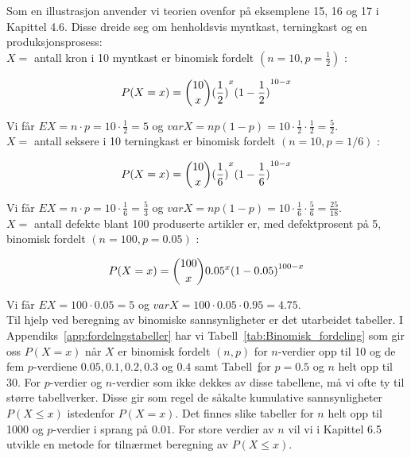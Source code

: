 \noindent Som en illustrasjon anvender vi teorien ovenfor på
 eksemplene 15, 16 og 17 i Kapittel 4.6. Disse dreide seg om henholdsvis
 myntkast, terningkast og en produksjonsprosess: \\

\noindent $X=$ antall kron i 10 myntkast er binomisk fordelt
 $(n=10,p=\frac{1}{2})$ :

\[ P(X=x)={{10}\choose{x}}{(\frac{1}{2})}^x{(1-\frac{1}{2})}^{10-x} \]

\noindent Vi får $EX=n\cdot p=10 \cdot \frac{1}{2}=5$ og
 $varX=np(1-p)=10 \cdot \frac{1}{2} \cdot \frac{1}{2} = \frac{5}{2}$.\\ 

\noindent  $X=$ antall seksere i 10 terningkast er binomisk fordelt
$(n=10, p=1/6)$ :

\[ P(X=x)={{10}\choose{x}}{(\frac{1}{6})}^x{(1-\frac{1}{6})}^{10-x} \]

\noindent Vi får $EX=n\cdot p=10 \cdot \frac{1}{6}=\frac{5}{3}$ og
 $varX=np(1-p)=10 \cdot \frac{1}{6} \cdot \frac{5}{6} = \frac{25}{18}$.\\ 

\noindent $X=$ antall defekte blant 100 produserte artikler er, med
defektprosent på 5, binomisk fordelt $(n=100, p=0.05)$ :

\[ P(X=x)={{100}\choose{x}}{0.05}^x{(1-0.05)}^{100-x} \]

\noindent Vi får $EX=100\cdot 0.05=5$ og $var X=100\cdot 0.05\cdot
0.95=4.75$. \\

Til hjelp ved beregning av binomiske sannsynligheter er det
utarbeidet tabeller. I Appendiks~\ref{app:fordelngstabeller} 
har vi Tabell~\ref{tab:Binomisk_fordeling} som gir oss
$P(X=x)$ når $X$ er binomisk fordelt $(n,p)$ for $n$-verdier opp
til 10 og de fem $p$-verdiene $0.05, 0.1, 0.2, 0.3$ og $0.4$ samt
Tabell~\href{tab:Binomisk_fordeling_p05} for $p=0.5$ og $n$ helt opp til 30. For $p$-verdier og
$n$-verdier som ikke dekkes av disse tabellene, må vi ofte ty til
større tabellverker. Disse gir som regel de såkalte kumulative
sannsynligheter $P(X\leq x)$ istedenfor $P(X=x)$. Det finnes
slike tabeller for $n$ helt opp til 1000 og $p$-verdier i sprang på
$0.01$. For store verdier av $n$ vil vi i Kapittel 6.5 utvikle en
metode for tilnærmet beregning av $P(X\leq x)$. \\


